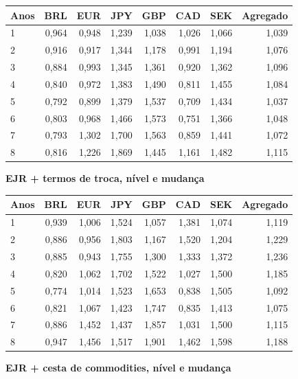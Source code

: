\documentclass[10pt,a4paper]{article}
\begin{document}
{\footnotesize
\begin{center}\begin{tabular}{lrrrrrrr}\toprule
Anos & BRL & EUR & JPY & GBP & CAD & SEK & Agregado \\ \midrule
1 & 0,964 & 0,948 & 1,239 & 1,038 & 1,026 & 1,066 & 1,039 \\
2 & 0,916 & 0,917 & 1,344 & 1,178 & 0,991 & 1,194 & 1,076 \\
3 & 0,884 & 0,993 & 1,345 & 1,361 & 0,920 & 1,362 & 1,096 \\
4 & 0,840 & 0,972 & 1,383 & 1,490 & 0,811 & 1,455 & 1,084 \\
5 & 0,792 & 0,899 & 1,379 & 1,537 & 0,709 & 1,434 & 1,037 \\
6 & 0,803 & 0,968 & 1,466 & 1,573 & 0,751 & 1,366 & 1,048 \\
7 & 0,793 & 1,302 & 1,700 & 1,563 & 0,859 & 1,441 & 1,072 \\
8 & 0,816 & 1,226 & 1,869 & 1,445 & 1,161 & 1,482 & 1,115 \\\bottomrule\end{tabular}\end{center}}

\textbf{EJR + termos de troca, nível e mudança}

{\footnotesize
\begin{center}\begin{tabular}{lrrrrrrr}\toprule
Anos & BRL & EUR & JPY & GBP & CAD & SEK & Agregado \\ \midrule
1 & 0,939 & 1,006 & 1,524 & 1,057 & 1,381 & 1,074 & 1,119 \\
2 & 0,886 & 0,956 & 1,803 & 1,167 & 1,520 & 1,204 & 1,229 \\
3 & 0,885 & 0,943 & 1,755 & 1,300 & 1,333 & 1,372 & 1,236 \\
4 & 0,820 & 1,062 & 1,702 & 1,522 & 1,027 & 1,500 & 1,185 \\
5 & 0,774 & 1,014 & 1,523 & 1,653 & 0,838 & 1,505 & 1,092 \\
6 & 0,821 & 1,067 & 1,423 & 1,747 & 0,835 & 1,413 & 1,075 \\
7 & 0,886 & 1,452 & 1,437 & 1,857 & 1,031 & 1,500 & 1,115 \\
8 & 0,947 & 1,456 & 1,517 & 1,901 & 1,462 & 1,598 & 1,188 \\\bottomrule\end{tabular}\end{center}}

\textbf{EJR + cesta de commodities, nível e mudança}
\end{document}
